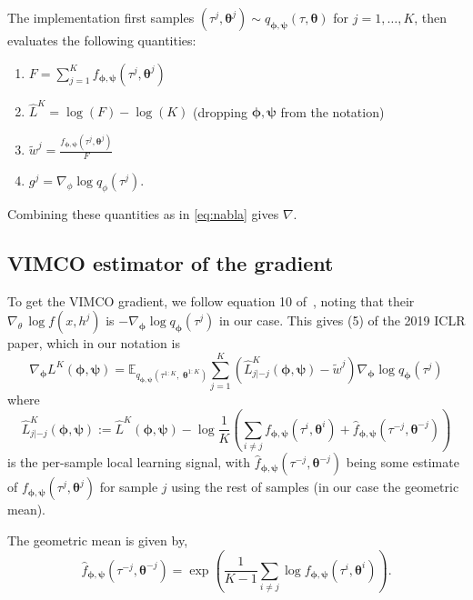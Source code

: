 \documentclass{article}
\newcommand{\bParam}{\bm{\theta}}
\begin{document}
The implementation first samples $(\tau^j, \bParam^j) \sim q_{\bm{\phi}, \bm{\psi}}(\tau, \bParam)$ for $j = 1, \ldots, K$, then evaluates the following quantities:
\begin{enumerate}
    \item $F = \sum_{j=1}^{K} f_{\bm{\phi},\bm{\psi}}(\tau^j, \bParam^j)$
    \item $\hat{L}^{K} = \log(F) - \log(K)$ (dropping $\bm{\phi}, \bm{\psi}$ from the notation)
    \item $\tilde{w}^j = \frac{f_{\bm{\phi},\bm{\psi}}(\tau^j, \bParam^j)}{F}$
    \item $g^j = \nabla_{\phi} \log q_{\phi}(\tau^j)$.
\end{enumerate}
Combining these quantities as in \eqref{eq:nabla} gives $\nabla$.

\subsection*{VIMCO estimator of the gradient}

To get the VIMCO gradient, we follow equation 10 of~\cite{Mnih2016-ec}, noting that their $\nabla_\theta \, \log f(x, h^j)$ is $-\nabla_{\bm{\phi}} \log q_{\bm{\phi}}(\tau^j)$ in our case.
This gives (5) of the 2019 ICLR paper, which in our notation is
\[
\nabla_{\bm{\phi}} L^K(\bm{\phi},{\bm{\psi}}) = \mathbb{E}_{q_{\bm{\phi},{\bm{\psi}}}(\tau^{1:K},\;\bm{\theta}^{1:K})}\sum_{j=1}^K\left(\hat{L}_{j|-j}^K(\bm{\phi},{\bm{\psi}})-\tilde{w}^j\right)\nabla_{\bm{\phi}}\log q_{\bm{\phi}}(\tau^j)
\]
where
\begin{equation}
\hat{L}_{j|-j}^K(\bm{\phi},{\bm{\psi}}) :=  \hat{L}^K(\bm{\phi},{\bm{\psi}}) - \log\frac1K\left(\sum_{i\neq j}f_{\bm{\phi},{\bm{\psi}}}(\tau^i,\bm{\theta}^i) + \hat{f}_{\bm{\phi},{\bm{\psi}}}(\tau^{-j},\bm{\theta}^{-j})\right)
\label{eq:perSampleLearning}
\end{equation}
is the per-sample local learning signal, with $\hat{f}_{\bm{\phi},{\bm{\psi}}}(\tau^{-j},\bm{\theta}^{-j})$ being some estimate of $f_{\bm{\phi},{\bm{\psi}}}(\tau^j,\bm{\theta}^j)$ for sample $j$ using the rest of samples (in our case the geometric mean).

The geometric mean is given by,
\begin{equation}\label{eq:f_hat}
    \hat{f}_{\bm{\phi}, \bm{\psi}}(\tau^{-j}, \bm{\theta}^{-j})  = \exp\left( \frac{1}{K-1} \sum_{i \not= j} \log f_{\bm{\phi}, \bm{\psi}}(\tau^i, \bm{\theta}^i) \right).
\end{equation}
\end{document}
